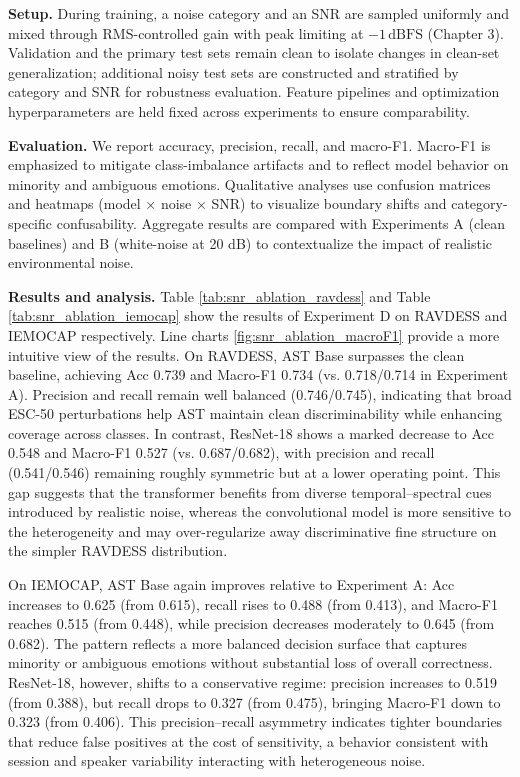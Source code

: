 \textbf{Setup.} During training, a noise category and an SNR are sampled uniformly and mixed through RMS-controlled gain with peak limiting at \(-1\,\mathrm{dBFS}\) (Chapter 3). Validation and the primary test sets remain clean to isolate changes in clean-set generalization; additional noisy test sets are constructed and stratified by category and SNR for robustness evaluation. Feature pipelines and optimization hyperparameters are held fixed across experiments to ensure comparability.

\textbf{Evaluation.} We report accuracy, precision, recall, and macro-F1. Macro-F1 is emphasized to mitigate class-imbalance artifacts and to reflect model behavior on minority and ambiguous emotions. Qualitative analyses use confusion matrices and heatmaps (model × noise × SNR) to visualize boundary shifts and category-specific confusability. Aggregate results are compared with Experiments A (clean baselines) and B (white-noise at 20 dB) to contextualize the impact of realistic environmental noise.

\textbf{Results and analysis.} Table \ref{tab:snr_ablation_ravdess} and Table \ref{tab:snr_ablation_iemocap} show the results of Experiment D on RAVDESS and IEMOCAP respectively. Line charts \ref{fig:snr_ablation_macroF1} provide a more intuitive view of the results. On RAVDESS, AST Base surpasses the clean baseline, achieving Acc 0.739 and Macro-F1 0.734 (vs. 0.718/0.714 in Experiment A). Precision and recall remain well balanced (0.746/0.745), indicating that broad ESC-50 perturbations help AST maintain clean discriminability while enhancing coverage across classes. In contrast, ResNet-18 shows a marked decrease to Acc 0.548 and Macro-F1 0.527 (vs. 0.687/0.682), with precision and recall (0.541/0.546) remaining roughly symmetric but at a lower operating point. This gap suggests that the transformer benefits from diverse temporal–spectral cues introduced by realistic noise, whereas the convolutional model is more sensitive to the heterogeneity and may over-regularize away discriminative fine structure on the simpler RAVDESS distribution.

On IEMOCAP, AST Base again improves relative to Experiment A: Acc increases to 0.625 (from 0.615), recall rises to 0.488 (from 0.413), and Macro-F1 reaches 0.515 (from 0.448), while precision decreases moderately to 0.645 (from 0.682). The pattern reflects a more balanced decision surface that captures minority or ambiguous emotions without substantial loss of overall correctness. ResNet-18, however, shifts to a conservative regime: precision increases to 0.519 (from 0.388), but recall drops to 0.327 (from 0.475), bringing Macro-F1 down to 0.323 (from 0.406). This precision–recall asymmetry indicates tighter boundaries that reduce false positives at the cost of sensitivity, a behavior consistent with session and speaker variability interacting with heterogeneous noise.


